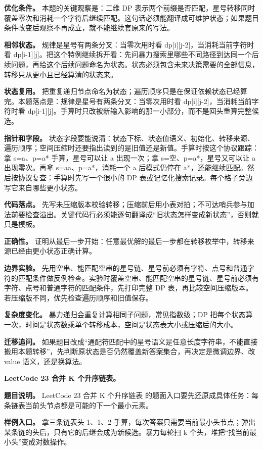 \textbf{优化条件。} 本题的关键观察是：二维 DP 表示两个前缀是否匹配，星号转移同时覆盖零次和消耗一个字符后继续匹配。这句话必须能翻译成可维护状态；如果题目条件改变后观察不再成立，就不能继续套原来的写法。

\textbf{相邻状态。} 规律是星号有两条分叉：当零次用时看 dp[i][j-2]，当消耗当前字符时看 dp[i-1][j]。把这个特例继续拆开看：先问暴力搜索里哪些不同路径到达同一个后续问题，再给这个后续问题命名为状态。状态必须包含未来决策需要的全部信息，转移只从更小且已经算清的状态来。

\textbf{状态复用。} 把重复递归节点命名为状态；遍历顺序只是在保证依赖状态已经算完。本题落点是：规律是星号有两条分叉：当零次用时看 dp[i][j-2]，当消耗当前字符时看 dp[i-1][j]。手算时只改被新输入影响的那一小部分，而不是回头重算完整候选。

\textbf{指针和字段。} 状态字段要能说清：状态下标、状态值语义、初始化、转移来源、遍历顺序；空间压缩时还要指出读到的是旧值还是新值。手算时按这个协议跟踪：拿 s=a、p=a* 手算，星号可以让 a 出现一次；拿 s=空、p=a*，星号又可以让 a 出现零次。再拿 s=aa、p=a*，消耗一个 a 后模式仍停在 a*，还能继续匹配。然后按协议复查：手算时先写一个很小的 DP 表或记忆化搜索记录。每个格子旁边写它来自哪些更小状态。

\textbf{代码落点。} 先写未压缩版本校验转移；压缩前后用小表对拍；不可达哨兵参与加法前要检查溢出。关键代码行必须能逐句翻译成“旧状态怎样变成新状态”，否则就只是模板。

\textbf{正确性。} 证明从最后一步开始：任意最优解的最后一步都在转移枚举中，转移来源已经由更小状态正确计算。

\textbf{边界实验。} 先用空串、能匹配空串的星号链、星号前必须有字符、点号和普通字符的匹配条件做反例检查。实验时覆盖空串、能匹配空串的星号链、星号前必须有字符、点号和普通字符的匹配条件，先打印完整 DP 表，再比较空间压缩版本。若压缩版不同，优先检查遍历顺序和旧值保存。

\textbf{复杂度变化。} 暴力递归会重复计算相同子问题，常见指数级；DP 把每个状态算一次，时间是状态数乘单个转移成本，空间是状态表大小或压缩后的大小。

\textbf{迁移追问。} 如果题目改成“通配符匹配中的星号语义是任意长度字符串，不能直接搬用本题转移”，先判断原状态是否仍然覆盖新答案集合，再决定是微调边界、改 value 语义，还是换算法。

\noindent\textbf{LeetCode 23 合并 K 个升序链表。}

\textbf{题目说明。} LeetCode 23 合并 K 个升序链表 的题面入口要先还原成具体任务：每条链表当前头节点都是可能的下一个最小元素。

\textbf{样例入口。} 拿三条链表头 1、1、2 手算，每次答案只需要当前最小头节点；弹出某条链的头后，只有它的后继会成为新候选。暴力每轮扫 k 个头，堆把“找当前最小头”变成对数操作。

